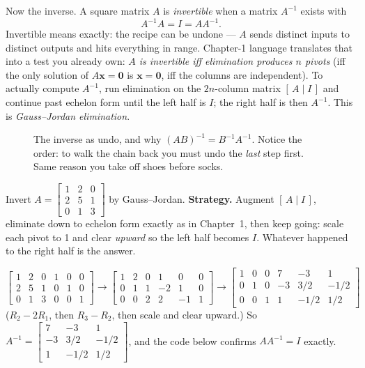 Now the inverse. A square matrix $A$ is \emph{invertible} when a matrix $A^{-1}$ exists with
\[
  A^{-1}A = I = AA^{-1}.
\]
Invertible means exactly: the recipe can be undone — $A$ sends distinct inputs to distinct outputs and hits everything in range. Chapter-1 language translates that into a test you already own: \emph{$A$ is invertible iff elimination produces $n$ pivots} (iff the only solution of $A\mathbf{x}=\mathbf{0}$ is $\mathbf{x}=\mathbf{0}$, iff the columns are independent). To actually compute $A^{-1}$, run elimination on the $2n$-column matrix $[\,A\mid I\,]$ and continue past echelon form until the left half is $I$; the right half is then $A^{-1}$. This is \emph{Gauss--Jordan elimination}.

\begin{figure}[htbp]
\centering

\caption{The inverse as undo, and why $(AB)^{-1}=B^{-1}A^{-1}$. Notice the order: to walk the chain back you must undo the \emph{last} step first. Same reason you take off shoes before socks.}
\label{fig:inverseundo}
\end{figure}

\begin{example}\label{ex:inverse}
Invert $A=\begin{bmatrix}1&2&0\\2&5&1\\0&1&3\end{bmatrix}$ by Gauss--Jordan.
\textbf{Strategy.} Augment $[\,A\mid I\,]$, eliminate down to echelon form exactly as in Chapter~1, then keep going: scale each pivot to 1 and clear \emph{upward} so the left half becomes $I$. Whatever happened to the right half is the answer.
\begin{solution}
\[
\left[\begin{array}{ccc|ccc}1&2&0&1&0&0\\2&5&1&0&1&0\\0&1&3&0&0&1\end{array}\right]
\to\left[\begin{array}{ccc|ccc}1&2&0&1&0&0\\0&1&1&-2&1&0\\0&0&2&2&-1&1\end{array}\right]
\to\left[\begin{array}{ccc|ccc}1&0&0&7&-3&1\\0&1&0&-3&3/2&-1/2\\0&0&1&1&-1/2&1/2\end{array}\right]
\]
($R_2-2R_1$, then $R_3-R_2$, then scale and clear upward.) So
\(
A^{-1}=\begin{bmatrix}7&-3&1\\-3&3/2&-1/2\\1&-1/2&1/2\end{bmatrix}
\), and the code below confirms $AA^{-1}=I$ exactly.
\end{solution}
\end{example}

